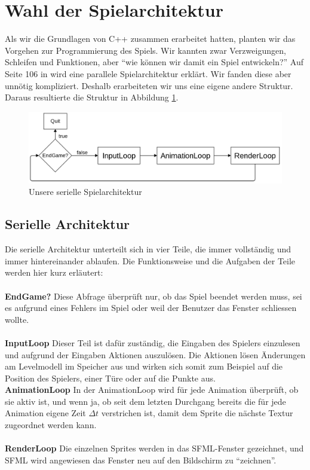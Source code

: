 \documentclass[11pt,a4paper]{scrbook}
\newcommand{\q}[1]{``#1''}
\begin{document}
\section{Wahl der Spielarchitektur}
Als wir die Grundlagen von C++ zusammen erarbeitet hatten, planten wir das Vorgehen zur Programmierung des Spiels.
Wir kannten zwar Verzweigungen, Schleifen und Funktionen, aber \q{wie können wir damit ein Spiel entwickeln?} Auf Seite 106 in \cite{sfml_gamedev}
wird eine parallele Spielarchitektur erklärt. Wir fanden diese aber unnötig kompliziert. Deshalb erarbeiteten wir uns eine eigene andere Struktur. Daraus resultierte die Struktur in Abbildung \ref{fig:seriell}.\\
\begin{figure}[h]
\centering
\includegraphics[scale=0.3]{img/gameloops.png}
\caption{Unsere serielle Spielarchitektur}
\label{fig:seriell}
\end{figure}

\subsection{Serielle Architektur}
\label{Loops}
Die serielle Architektur unterteilt sich in vier Teile, die immer vollständig und immer hintereinander ablaufen. Die Funktionsweise
und die Aufgaben der Teile werden hier kurz erläutert:\\
\\
\textbf{EndGame?}
Diese Abfrage überprüft nur, ob das Spiel beendet werden muss, sei es aufgrund eines Fehlers im Spiel
oder weil der Benutzer das Fenster schliessen wollte.\\
\\
\textbf{InputLoop}
Dieser Teil ist dafür zuständig, die Eingaben des Spielers einzulesen und aufgrund der Eingaben Aktionen auszulösen. Die Aktionen lösen Änderungen am Levelmodell im Speicher aus und wirken sich somit zum Beispiel auf die Position des Spielers, einer Türe oder auf die Punkte aus. 
\\
\textbf{AnimationLoop}
In der AnimationLoop wird für jede Animation überprüft, ob sie aktiv ist, und wenn ja, ob seit dem letzten Durchgang bereits die für jede Animation
eigene Zeit $\Delta t$ verstrichen ist, damit dem Sprite die nächste Textur zugeordnet werden kann.\\
\\
\textbf{RenderLoop}
Die einzelnen Sprites werden in das SFML-Fenster gezeichnet, und SFML wird angewiesen das Fenster neu auf den Bildschirm zu \q{zeichnen}.
\end{document}

